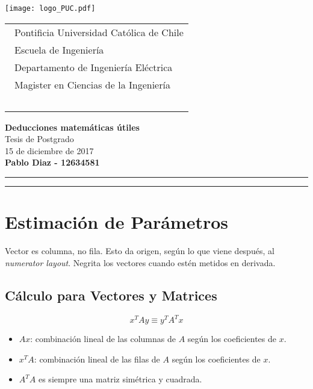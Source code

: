 \documentclass{article}
\begin{document}
\thispagestyle{empty}

\vspace*{-1cm}
\texttt{[image: logo\_PUC.pdf]}
\vspace*{-2cm}

\hspace*{2cm}
 \begin{tabular}{l}
  {\ Pontificia Universidad Católica de Chile}\\
  {\ Escuela de Ingeniería}\\
  {\ Departamento de Ingeniería Eléctrica}\\
  {\ Magister en Ciencias de la Ingeniería }\\
  {\  }\\
 \end{tabular}
 \hfill 
\vspace*{-0.2cm}
\begin{center}
{\Large\bf Deducciones matemáticas útiles}\\
\vspace*{2mm}
{\Large Tesis de Postgrado}\\
{15 de diciembre de 2017}\\
\vspace*{1mm}
{\bf Pablo Diaz - 12634581 }\\
\vspace*{1mm}
\end{center}
\hrule\vspace*{2pt}\hrule
\setcounter{page}{1}
\section{Estimación de Parámetros}
Vector es columna, no fila. Esto da origen, según lo que viene después, al \textit{numerator layout}.
Negrita los vectores cuando estén metidos en derivada.
\subsection{Cálculo para Vectores y Matrices}

$$x^TAy \equiv y^TA^Tx$$

\begin{itemize}
\item $Ax$: combinación lineal de las columnas de $A$ según los coeficientes de $x$.
\item $x^TA$: combinación lineal de las filas de $A$ según los coeficientes de $x$.
\item $A^TA$ es siempre una matriz simétrica y cuadrada.
\end{itemize}
\end{document}
